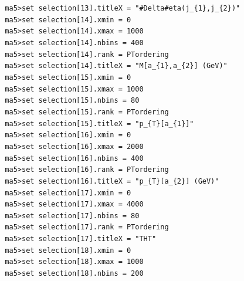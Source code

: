 \documentclass[a4paper, 10pt]{article}
\begin{document}
\texttt{ }\texttt{ }\texttt{ma5>set selection[13].titleX = "\#Delta\#eta(j\_\{1\},j\_\{2\})"\\
}
\texttt{ }\texttt{ }\texttt{ma5>set selection[14].xmin = 0\\
}
\texttt{ }\texttt{ }\texttt{ma5>set selection[14].xmax = 1000\\
}
\texttt{ }\texttt{ }\texttt{ma5>set selection[14].nbins = 400\\
}
\texttt{ }\texttt{ }\texttt{ma5>set selection[14].rank = PTordering\\
}
\texttt{ }\texttt{ }\texttt{ma5>set selection[14].titleX = "M[a\_\{1\},a\_\{2\}] (GeV)"\\
}
\texttt{ }\texttt{ }\texttt{ma5>set selection[15].xmin = 0\\
}
\texttt{ }\texttt{ }\texttt{ma5>set selection[15].xmax = 1000\\
}
\texttt{ }\texttt{ }\texttt{ma5>set selection[15].nbins = 80\\
}
\texttt{ }\texttt{ }\texttt{ma5>set selection[15].rank = PTordering\\
}
\texttt{ }\texttt{ }\texttt{ma5>set selection[15].titleX = "p\_\{T\}[a\_\{1\}]"\\
}
\texttt{ }\texttt{ }\texttt{ma5>set selection[16].xmin = 0\\
}
\texttt{ }\texttt{ }\texttt{ma5>set selection[16].xmax = 2000\\
}
\texttt{ }\texttt{ }\texttt{ma5>set selection[16].nbins = 400\\
}
\texttt{ }\texttt{ }\texttt{ma5>set selection[16].rank = PTordering\\
}
\texttt{ }\texttt{ }\texttt{ma5>set selection[16].titleX = "p\_\{T\}[a\_\{2\}] (GeV)"\\
}
\texttt{ }\texttt{ }\texttt{ma5>set selection[17].xmin = 0\\
}
\texttt{ }\texttt{ }\texttt{ma5>set selection[17].xmax = 4000\\
}
\texttt{ }\texttt{ }\texttt{ma5>set selection[17].nbins = 80\\
}
\texttt{ }\texttt{ }\texttt{ma5>set selection[17].rank = PTordering\\
}
\texttt{ }\texttt{ }\texttt{ma5>set selection[17].titleX = "THT"\\
}
\texttt{ }\texttt{ }\texttt{ma5>set selection[18].xmin = 0\\
}
\texttt{ }\texttt{ }\texttt{ma5>set selection[18].xmax = 1000\\
}
\texttt{ }\texttt{ }\texttt{ma5>set selection[18].nbins = 200\\
}
\end{document}
